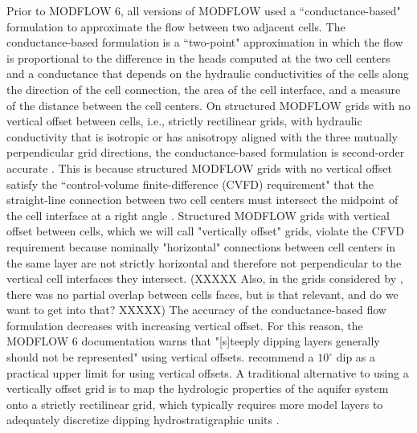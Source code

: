 \documentclass{article}
\begin{document}
Prior to MODFLOW 6, all versions of MODFLOW used a ``conductance-based" formulation to approximate the flow between two adjacent cells. The conductance-based formulation is a ``two-point" approximation in which the flow is proportional to the difference in the heads computed at the two cell centers and a conductance that depends on the hydraulic conductivities of the cells along the direction of the cell connection, the area of the cell interface, and a measure of the distance between the cell centers. On structured MODFLOW grids with no vertical offset between cells, i.e., strictly rectilinear grids, with hydraulic conductivity that is isotropic or has anisotropy aligned with the three mutually perpendicular grid directions, the conductance-based formulation is second-order accurate \citep{dehotin2010modeling, modflow6gwf}. This is because structured MODFLOW grids with no vertical offset satisfy the ``control-volume finite-difference (CVFD) requirement" that the straight-line connection between two cell centers must intersect the midpoint of the cell interface at a right angle \citep{narasimhan1976integrated}. Structured MODFLOW grids with vertical offset between cells, which we will call "vertically offset" grids, violate the CFVD requirement because nominally "horizontal" connections between cell centers in the same layer are not strictly horizontal and therefore not perpendicular to the vertical cell interfaces they intersect. (XXXXX Also, in the grids considered by \cite{narasimhan1976integrated}, there was no partial overlap between cells faces, but is that relevant, and do we want to get into that? XXXXX) The accuracy of the conductance-based flow formulation decreases with increasing vertical offset. For this reason, the MODFLOW 6 documentation \citep{modflow6gwf} warns that "[s]teeply dipping layers generally should not be represented" using vertical offsets. \cite{anderson2015applied} recommend a $10^{\circ}$ dip as a practical upper limit for using vertical offsets. A traditional alternative to using a vertically offset grid is to map the hydrologic properties of the aquifer system onto a strictly rectilinear grid, which typically requires more model layers to adequately discretize dipping hydrostratigraphic units \citep{modflow84}.
\end{document}
